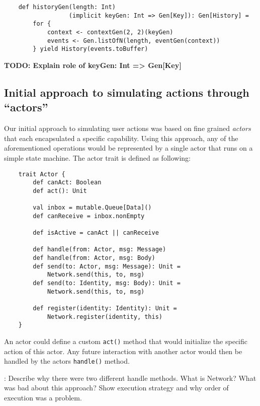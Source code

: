 \begin{verbatim}
    def historyGen(length: Int)
                  (implicit keyGen: Int => Gen[Key]): Gen[History] =
        for {
            context <- contextGen(2, 2)(keyGen)
            events <- Gen.listOfN(length, eventGen(context))
        } yield History(events.toBuffer)
\end{verbatim}

\textbf{TODO: Explain role of keyGen: Int => Gen[Key]}

\subsection{Initial approach to simulating actions through ``actors''}
Our initial approach to simulating user actions was based on fine grained \emph{actors} that each encapsulated a specific capability. 
Using this approach, any of the aforementioned operations would be represented by a single actor that runs on a simple state machine.
The actor trait is defined as following:
\begin{verbatim}
    trait Actor {
        def canAct: Boolean
        def act(): Unit
      
        val inbox = mutable.Queue[Data]()
        def canReceive = inbox.nonEmpty
      
        def isActive = canAct || canReceive
      
        def handle(from: Actor, msg: Message)
        def handle(from: Actor, msg: Body)
        def send(to: Actor, msg: Message): Unit = 
            Network.send(this, to, msg)
        def send(to: Identity, msg: Body): Unit = 
            Network.send(this, to, msg)
      
        def register(identity: Identity): Unit = 
            Network.register(identity, this)
    }
\end{verbatim}
An actor could define a custom \texttt{act()} method that would initialize the specific action of this actor. Any future interaction with another actor would then be handled by the actors \texttt{handle()} method. 

: Describe why there were two different handle methods. What is Network? What was bad about this approach? Show execution strategy and why order of execution was a problem.